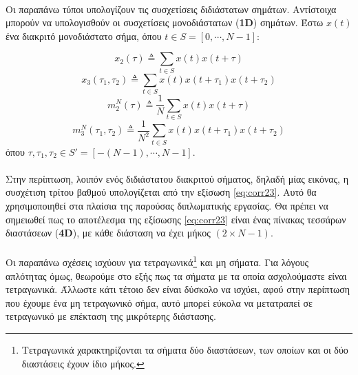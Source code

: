 \paragraph*{}
Οι παραπάνω τύποι υπολογίζουν τις συσχετίσεις διδιάστατων σημάτων. Αντίστοιχα μπορούν να υπολογισθούν οι συσχετίσεις μονοδιάστατων (\textbf{1D}) σημάτων. Έστω $x(t)$ ένα διακριτό μονοδιάστατο σήμα, όπου $t \in S = [0, \cdots ,N-1]$:

\begin{equation} 
x_2(\tau) \triangleq \sum\limits_{t \in S} x(t)x(t+\tau) 
\end{equation}
\begin{equation} 
x_3(\tau_1,\tau_2) \triangleq \sum\limits_{t \in S}x (t)x(t+\tau_1) x(t+\tau_2) 
\end{equation}
\begin{equation}
m_2^N(\tau) \triangleq \dfrac{1}{N} \sum\limits_{t \in S}x (t)x(t+\tau)
\end{equation}
\begin{equation}
m_3^N(\tau_1,\tau_2) \triangleq \dfrac{1}{N^2} \sum\limits_{t \in S}x(t) x(t+\tau_1)x(t+\tau_2)
\end{equation}
όπου $\tau, \tau_1, \tau_2 \in S'=[-(N-1), \cdots ,N-1]$.

\paragraph*{}
Στην περίπτωση, λοιπόν ενός διδιάστατου διακριτού σήματος, δηλαδή μίας εικόνας, η συσχέτιση τρίτου βαθμού υπολογίζεται από την εξίσωση \ref{eq:corr23}. Αυτό θα χρησιμοποιηθεί στα πλαίσια της παρούσας διπλωματικής εργασίας. Θα πρέπει να σημειωθεί πως το αποτέλεσμα της εξίσωσης \ref{eq:corr23} είναι ένας πίνακας τεσσάρων διαστάσεων (\textbf{4D}), με κάθε διάσταση να έχει μήκος $(2 \times N - 1)$.
\paragraph*{}
Οι παραπάνω σχέσεις ισχύουν για τετραγωνικά\footnote{Τετραγωνικά χαρακτηρίζονται τα σήματα δύο διαστάσεων, των οποίων και οι δύο διαστάσεις έχουν ίδιο μήκος.}  και μη σήματα. Για λόγους απλότητας όμως, θεωρούμε στο εξής πως τα σήματα με τα οποία ασχολούμαστε είναι τετραγωνικά. Άλλωστε κάτι τέτοιο δεν είναι δύσκολο να ισχύει, αφού στην περίπτωση που έχουμε ένα μη τετραγωνικό σήμα, αυτό μπορεί εύκολα να μετατραπεί σε τετραγωνικό με επέκταση της μικρότερης διάστασης.



